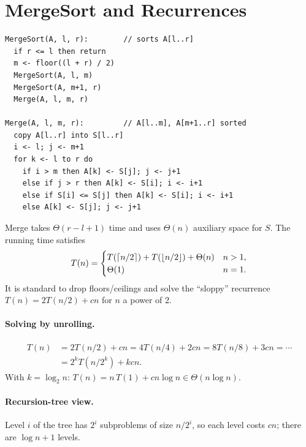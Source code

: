 \section{MergeSort and Recurrences}

\begin{lstlisting}
MergeSort(A, l, r):        // sorts A[l..r]
  if r <= l then return
  m <- floor((l + r) / 2)
  MergeSort(A, l, m)
  MergeSort(A, m+1, r)
  Merge(A, l, m, r)

Merge(A, l, m, r):         // A[l..m], A[m+1..r] sorted
  copy A[l..r] into S[l..r]
  i <- l; j <- m+1
  for k <- l to r do
    if i > m then A[k] <- S[j]; j <- j+1
    else if j > r then A[k] <- S[i]; i <- i+1
    else if S[i] <= S[j] then A[k] <- S[i]; i <- i+1
    else A[k] <- S[j]; j <- j+1
\end{lstlisting}

Merge takes $\Theta(r - l + 1)$ time and uses $\Theta(n)$ auxiliary space for $S$.
The running time satisfies
\[
T(n) = \begin{cases}
T(\left\lceil n/2 \right\rceil) + T(\left\lfloor n/2 \right\rfloor) + \Theta(n) & n > 1,\\
\Theta(1) & n = 1.
\end{cases}
\]
It is standard to drop floors/ceilings and solve the ``sloppy'' recurrence
$T(n) = 2T(n/2) + cn$ for $n$ a power of 2.

\paragraph{Solving by unrolling.}
\begin{align*}
T(n) &= 2T(n/2) + cn = 4T(n/4) + 2cn = 8T(n/8) + 3cn = \cdots\\
     &= 2^k T(n/2^k) + kcn.
\end{align*}
With $k = \log_2 n$: $T(n) = n\,T(1) + cn \log n \in \Theta(n \log n)$.

\paragraph{Recursion-tree view.} Level $i$ of the tree has $2^i$ subproblems of
size $n/2^i$, so each level costs $cn$; there are $\log n + 1$ levels.

